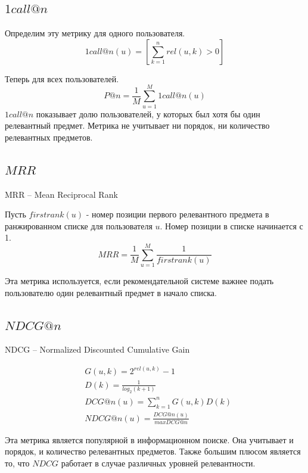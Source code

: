 \documentclass[14pt]{extarticle}
\begin{document}
\subsection{$1call@n$}
	Определим эту метрику для одного пользователя.
	\begin{equation*}
		1call@n(u) = [\sum_{k = 1}^n rel(u, k) > 0]
	\end{equation*}
	
	Теперь для всех пользователей.
	\begin{equation*}
		P@n = \frac{1}{M}\sum_{u = 1}^M 1call@n(u)
	\end{equation*}
	$1call@n$ показывает долю пользователей, у которых был хотя бы один релевантный предмет. Метрика не учитывает  ни порядок, ни количество релевантных предметов. 
\subsection{$MRR$}
	MRR -- Mean Reciprocal Rank
	
	Пусть $firstrank(u)$  - номер позиции первого релевантного предмета в ранжированном списке для пользователя $u$. Номер позиции в списке начинается с 1.
	\begin{equation*}
		MRR = \frac{1}{M}\sum^{M}_{u=1}\frac{1}{firstrank(u)}	
	\end{equation*}
	
	Эта метрика используется, если рекомендательной системе важнее подать пользователю один релевантный предмет в начало списка. 

	 
\subsection{$NDCG@n$}
	NDCG -- Normalized Discounted Cumulative Gain
	
	\begin{equation*}
	\begin{split}
	 & G(u, k) = 2^{rel(u, k)} - 1 \\
	 & D(k) = \frac{1}{log_2(k + 1)} \\
	 & DCG@n(u) = \sum_{k=1}^n G(u, k) D(k) \\
	 & NDCG@n(u) = \frac{DCG@n(u)}{max DCG@n}
	\end{split}			
	\end{equation*}
	
	Эта метрика является популярной в информационном поиске. Она учитывает и порядок, и количество релевантных предметов. Также большим плюсом является то, что $NDCG$ работает в случае различных уровней релевантности.
	
\end{document}
